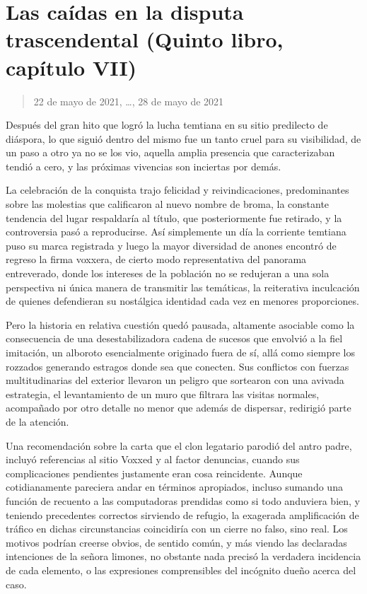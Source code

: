 \documentclass[
]{book}
\begin{document}
\hypertarget{las-cauxeddas-en-la-disputa-trascendental-quinto-libro-capuxedtulo-vii}{%
\section{Las caídas en la disputa trascendental (Quinto libro, capítulo VII)}\label{las-cauxeddas-en-la-disputa-trascendental-quinto-libro-capuxedtulo-vii}}

\begin{quote}
22 de mayo de 2021, \ldots, 28 de mayo de 2021
\end{quote}

Después del gran hito que logró la lucha temtiana en su sitio predilecto de diáspora, lo que siguió dentro del mismo fue un tanto cruel para su visibilidad, de un paso a otro ya no se los vio, aquella amplia presencia que caracterizaban tendió a cero, y las próximas vivencias son inciertas por demás.

La celebración de la conquista trajo felicidad y reivindicaciones, predominantes sobre las molestias que calificaron al nuevo nombre de broma, la constante tendencia del lugar respaldaría al título, que posteriormente fue retirado, y la controversia pasó a reproducirse. Así simplemente un día la corriente temtiana puso su marca registrada y luego la mayor diversidad de anones encontró de regreso la firma voxxera, de cierto modo representativa del panorama entreverado, donde los intereses de la población no se redujeran a una sola perspectiva ni única manera de transmitir las temáticas, la reiterativa inculcación de quienes defendieran su nostálgica identidad cada vez en menores proporciones.

Pero la historia en relativa cuestión quedó pausada, altamente asociable como la consecuencia de una desestabilizadora cadena de sucesos que envolvió a la fiel imitación, un alboroto esencialmente originado fuera de sí, allá como siempre los rozzados generando estragos donde sea que conecten. Sus conflictos con fuerzas multitudinarias del exterior llevaron un peligro que sortearon con una avivada estrategia, el levantamiento de un muro que filtrara las visitas normales, acompañado por otro detalle no menor que además de dispersar, redirigió parte de la atención.

Una recomendación sobre la carta que el clon legatario parodió del antro padre, incluyó referencias al sitio Voxxed y al factor denuncias, cuando sus complicaciones pendientes justamente eran cosa reincidente. Aunque cotidianamente pareciera andar en términos apropiados, incluso sumando una función de recuento a las computadoras prendidas como si todo anduviera bien, y teniendo precedentes correctos sirviendo de refugio, la exagerada amplificación de tráfico en dichas circunstancias coincidiría con un cierre no falso, sino real. Los motivos podrían creerse obvios, de sentido común, y más viendo las declaradas intenciones de la señora limones, no obstante nada precisó la verdadera incidencia de cada elemento, o las expresiones comprensibles del incógnito dueño acerca del caso.
\end{document}
